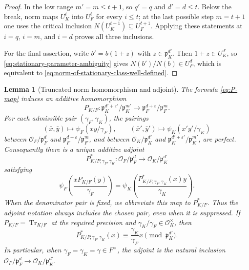 \documentclass[11pt]{amsart}
\newtheorem{lemma}[theorem]{Lemma}
\theoremstyle{definition}
\theoremstyle{remark}
\newcommand{\cO}{\mathcal O}
\newcommand{\p}{\mathfrak p}
\newcommand{\Tr}{\operatorname{Tr}}
\begin{document}
\begin{proof}
In the low range $m'=m\le t+1$, so $q'=q$ and $d'=d\le t$.
Below the break, norm maps $U_K^i$ into $U_F^i$ for every $i\le t$;
at the last possible step $m=t+1$ one uses the critical inclusion
$N(U_K^{t+1})\subseteq U_F^{t+1}$.  Applying these statements at
$i=q$, $i=m$, and $i=d$ proves all three inclusions.

For the final assertion, write $b'=b(1+z)$ with
$z\in\p_K^{d'}$.  Then $1+z\in U_K^{d'}$, so
\eqref{eq:stationary-parameter-ambiguity} gives
$N(b')/N(b)\in U_F^d$, which is equivalent to
\eqref{eq:norm-of-stationary-class-well-defined}.
\end{proof}

\begin{lemma}[Truncated norm homomorphism and adjoint]
\label{lem:truncated-norm-adjoint}
The formula \eqref{eq:P-map} induces an additive homomorphism
\[
 P_{K/F}:\p_K^{d'+\varepsilon'}/\p_K^{m'}
 \longrightarrow
 \p_F^{d+\varepsilon}/\p_F^m.
\]
For each admissible pair $(\gamma_F,\gamma_K)$, the pairings
\[
 (\bar x,\bar y)\longmapsto
 \psi_F(xy/\gamma_F),\qquad
 (\bar x',\bar y')\longmapsto
 \psi_K(x'y'/\gamma_K)
\]
between
$\cO_F/\p_F^d$ and
$\p_F^{d+\varepsilon}/\p_F^m$, and between
$\cO_K/\p_K^{d'}$ and
$\p_K^{d'+\varepsilon'}/\p_K^{m'}$, are perfect.  Consequently there
is a unique additive adjoint
\begin{equation}\label{eq:Pstar}
 P^*_{K/F;\gamma_F,\gamma_K}:
 \cO_F/\p_F^d\longrightarrow\cO_K/\p_K^{d'}
\end{equation}
satisfying
\begin{equation}\label{eq:Pstar-def}
 \psi_F\left(\frac{xP_{K/F}(y)}{\gamma_F}\right)
 =\psi_K\left(
   \frac{P^*_{K/F;\gamma_F,\gamma_K}(x)y}{\gamma_K}\right).
\end{equation}
When the denominator pair is fixed, we abbreviate this map to
$P^*_{K/F}$.  Thus the adjoint notation always includes the chosen
pair, even when it is suppressed.  If $P_{K/F}=\Tr_{K/F}$ at the
required precision and $\gamma_K/\gamma_F\in\cO_K^\times$, then
\begin{equation}\label{eq:Pstar-trace-denominator-ratio}
 P^*_{K/F;\gamma_F,\gamma_K}(x)
 \equiv\frac{\gamma_K}{\gamma_F}x\pmod{\p_K^{d'}}.
\end{equation}
In particular, when
$\gamma_F=\gamma_K=\gamma\in F^\times$, the adjoint is the natural
inclusion $\cO_F/\p_F^d\to\cO_K/\p_K^{d'}$.
\end{lemma}
\end{document}
